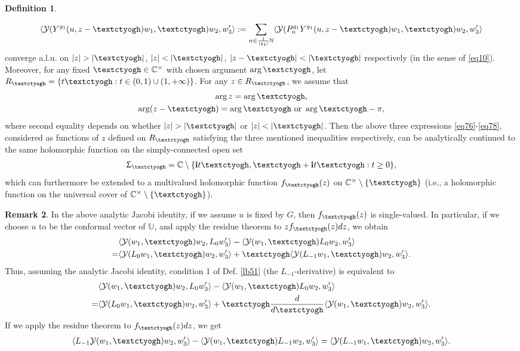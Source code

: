 \documentclass[11pt,b5paper,notitlepage]{article}
\theoremstyle{definition}
\newtheorem{df}{Definition}[subsection]
\newtheorem{rem}[df]{Remark}
\theoremstyle{plain}
\newcommand{\mc}{\mathcal}
\newcommand{\bk}[1]{\langle {#1}\rangle}
\newcommand{\im}{\mathbf{i}}
\newcommand{\Ubb}{\mathbb U}
\newcommand{\Cbb}{\mathbb C}
\newcommand{\Nbb}{\mathbb N}
\newcommand{\tipaz}{\text{\textctyogh}}
\numberwithin{equation}{subsection}
\begin{document}
\begin{df}
\begin{enumerate}
\begin{gather}
	\bk{\mc Y(Y^{g_1}(u,z-\tipaz)w_1,\tipaz)w_2,w'_3}:=\sum_{n\in\frac 1{|g_1|}\Nbb}	\bk{\mc Y(P_n^{g_1}Y^{g_1}(u,z-\tipaz)w_1,\tipaz)w_2,w'_3}\label{eq78}
\end{gather}
converge a.l.u.  on $|z|>|\tipaz|$, $|z|<|\tipaz|$, $|z-\tipaz|<|\tipaz|$ respectively (in the sense of \eqref{eq10}). Moreover, for any fixed $\tipaz\in\Cbb^\times$ with chosen argument $\arg \tipaz$, let $R_{\tipaz}=\{t\tipaz:t\in(0,1)\cup (1,+\infty)\}$. For any $z\in R_{\tipaz}$, we assume that 
\begin{gather}
\begin{array}{c}
\arg z=\arg\tipaz,\\[0.7ex]
\arg(z-\tipaz)=\arg \tipaz\text{ or }\arg \tipaz-\pi,
\end{array}	\label{eq82}
\end{gather}
where second equality depends on whether $|z|>|\tipaz|$ or $|z|<|\tipaz|$. Then the above three expressions \eqref{eq76}-\eqref{eq78}, considered as functions of $z$ defined on $R_{\tipaz}$ satisfying the three mentioned inequalities respectively, can be analytically continued to the same holomorphic function on the simply-connected open set
\begin{align*}
\Upsigma_\tipaz=\Cbb\setminus\{\im t\tipaz,\tipaz+\im t\tipaz:t\geq 0\},	
\end{align*}
which can furthermore be extended to a multivalued holomorphic function $f_{\tipaz}(z)$ on $\Cbb^\times\setminus\{\tipaz\}$ (i.e., a holomorphic function on the universal cover of $\Cbb^\times\setminus\{\tipaz\}$).
\end{enumerate}
\end{df}

\begin{rem}\label{lb55}
In the above analytic Jacobi identity, if we assume $u$ is fixed by $G$, then $f_\tipaz(z)$ is single-valued. In particular, if we choose $u$ to be the conformal vector of $\Ubb$, and apply the residue theorem to $zf_\tipaz(z)dz$, we obtain
\begin{align*}
	&\bk{\mc Y(w_1,\tipaz)w_2,L_0w_3'}-\bk{\mc Y(w_1,\tipaz)L_0w_2,w_3'}\nonumber\\
	=&	\bk{\mc Y(L_0w_1,\tipaz)w_2,w_3'}+\tipaz\bk{\mc Y(L_{-1}w_1,\tipaz)w_2,w_3'}.
\end{align*}
Thus, assuming the analytic Jacobi identity, condition 1  of Def. \ref{lb51}  (the $L_{-1}$-derivative) is equivalent to
\begin{align}
	&\bk{\mc Y(w_1,\tipaz)w_2,L_0w_3'}-\bk{\mc Y(w_1,\tipaz)L_0w_2,w_3'}\nonumber\\
	=&	\bk{\mc Y(L_0w_1,\tipaz)w_2,w_3'}+\tipaz\frac d{d\tipaz}\bk{\mc Y(w_1,\tipaz)w_2,w_3'}\label{eq79}.
\end{align}	
If we apply the residue theorem to $f_\tipaz(z)dz$, we get
\begin{align}
\bk{L_{-1}\mc Y(w_1,\tipaz)w_2,w_3'}-\bk{\mc Y(w_1,\tipaz)L_{-1}w_2,w_3'}=\bk{\mc Y(L_{-1}w_1,\tipaz)w_2,w_3'}.\label{eq98}	
\end{align}
\end{rem}	
\end{document}
